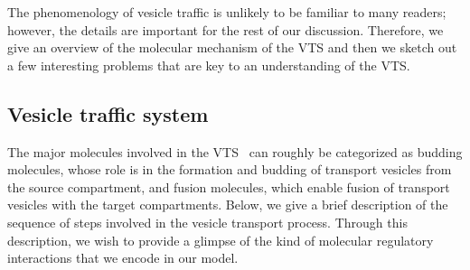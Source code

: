 The phenomenology of vesicle traffic is unlikely to be familiar to many readers; however, the details are important for the rest of our discussion. 
%
Therefore, we give an overview of the molecular mechanism of the VTS and then we sketch out a few interesting problems that are key to an understanding of the VTS.
%
\subsection{Vesicle traffic system}
\noindent The major molecules involved in the VTS~\cite{wells2005discovery} can roughly be categorized as budding molecules, whose role is in the formation and budding of transport vesicles from the source compartment, and fusion molecules, which enable fusion of transport vesicles with the target compartments. 
%
Below, we give a brief description of the sequence of steps involved in the vesicle transport process. 
%
Through this description, we wish to provide a glimpse of the kind of molecular regulatory interactions that we encode in our model.
 
